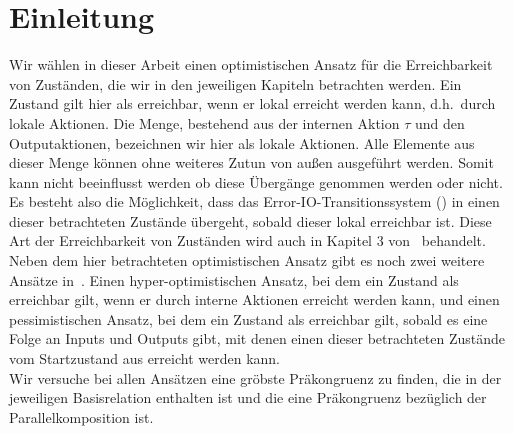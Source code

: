 \chapter{Einleitung}

Wir wählen in dieser Arbeit einen optimistischen Ansatz für die
Erreichbarkeit von Zuständen, die wir in den jeweiligen Kapiteln betrachten
werden. Ein Zustand gilt hier als erreichbar, wenn er lokal
erreicht werden kann, d.h.\ durch lokale Aktionen. Die Menge, bestehend aus der
internen Aktion $\tau$ und den Outputaktionen, bezeichnen wir hier als lokale
Aktionen. Alle Elemente aus dieser Menge können ohne
weiteres Zutun von außen ausgeführt werden. Somit kann nicht beeinflusst werden ob diese
Übergänge genommen werden oder nicht. Es besteht also die Möglichkeit, dass
das Error-IO-Transitionssystem (\EIO{}) in einen dieser betrachteten Zustände
übergeht, sobald dieser lokal erreichbar ist. Diese Art der Erreichbarkeit von
Zuständen wird auch in Kapitel 3 von~\cite{Vogler2014EIO} behandelt.\\ %
Neben dem hier betrachteten optimistischen Ansatz gibt es noch zwei weitere
Ansätze in~\cite{Vogler2014EIO}. Einen hyper-optimistischen Ansatz, bei dem ein
Zustand als erreichbar gilt, wenn er durch interne Aktionen erreicht werden
kann, und einen pessimistischen Ansatz, bei dem ein Zustand als erreichbar gilt,
sobald es eine Folge an Inputs und Outputs gibt, mit denen einen dieser
betrachteten Zustände vom Startzustand aus erreicht werden kann.\\
Wir versuche bei allen Ansätzen eine gröbste Präkongruenz zu finden, die in der
jeweiligen Basisrelation enthalten ist und die eine Präkongruenz bezüglich der
Parallelkomposition ist.
